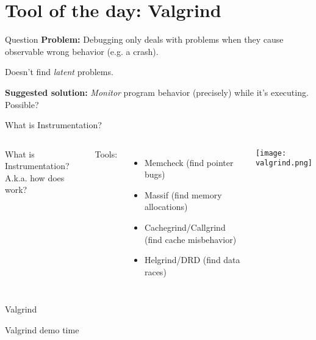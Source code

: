 \documentclass[english,compress]{beamer}
\begin{document}
\section[Valgrind]{Tool of the day: Valgrind}
\begin{frame}{Question}
  \textbf{Problem:} Debugging only deals with problems when they cause
  observable wrong behavior (e.g. a crash).

  \bigskip
  Doesn't find \emph{latent} problems.

  \bigskip
  \textbf{Suggested solution:} \emph{Monitor} program behavior
  (precisely) while it's executing. Possible?
\end{frame}
\begin{frame}{What is Instrumentation?}
  \begin{columns}
    What is Instrumentation?\\
    \hfill A.k.a. how does
     work?

    \begin{center}
    \end{center}

    \vspace{-0.7cm}
    Tools:
    \begin{itemize}
      \item Memcheck (find pointer bugs)
      \item Massif (find memory allocations)
      \item Cachegrind/Callgrind (find cache misbehavior)
      \item Helgrind/DRD (find data races)
    \end{itemize}

    \texttt{[image: valgrind.png]}
  \end{columns}
\end{frame}
\begin{frame}{Valgrind}
  \begin{center}
  \Huge Valgrind demo time
  \end{center}
\end{frame}
\end{document}
